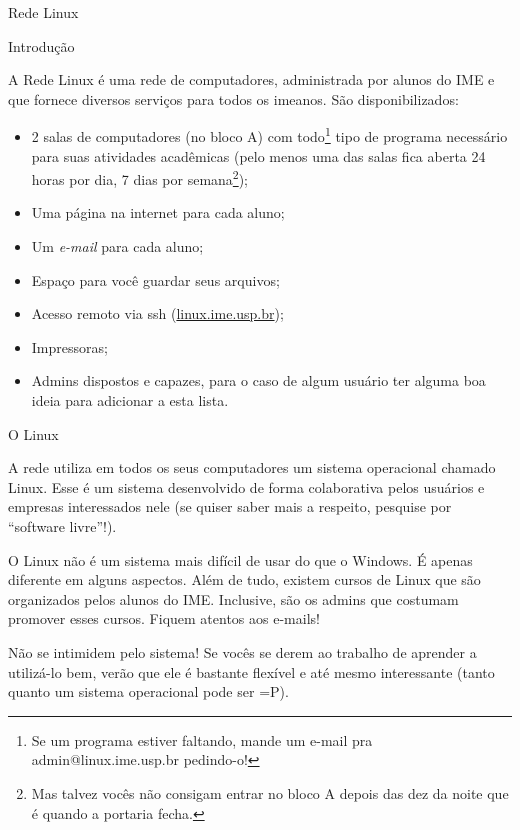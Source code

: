 \begin{subsecao}{Rede Linux}


\begin{subsubsecao}{Introdução}

A Rede Linux é uma rede de computadores, administrada por alunos do IME e
que fornece diversos serviços para todos os imeanos.
São disponibilizados:

\vspace{-1em}

\begin{itemize}
\item 2 salas de computadores (no bloco A) com todo\footnote{ Se um programa
estiver faltando, mande um e-mail pra admin@linux.ime.usp.br pedindo-o!} tipo de
programa necessário para suas atividades acadêmicas (pelo menos uma das salas fica
aberta 24 horas por dia, 7 dias por semana\footnote{ Mas talvez vocês não
consigam entrar no bloco A depois das dez da noite que é quando a portaria
fecha.});
\item Uma página na internet para cada aluno;
\item Um \textit{e-mail} para cada aluno;
\item Espaço para você guardar seus arquivos;
\item Acesso remoto via ssh (\url{linux.ime.usp.br});
\item Impressoras;
\item Admins dispostos e capazes, para o caso de algum usuário ter alguma boa
ideia para adicionar a esta lista.
\end{itemize}
\end{subsubsecao}

\begin{subsubsecao}{O Linux}

A rede utiliza em todos os seus computadores um sistema operacional chamado
Linux. Esse é um sistema desenvolvido de forma colaborativa pelos usuários
e empresas interessados nele (se quiser saber mais a respeito, pesquise
por ``software livre''!).

O Linux não é um sistema mais difícil de usar do que o Windows. É apenas
diferente em alguns aspectos. Além de tudo, existem cursos de Linux que são
organizados pelos alunos do IME. Inclusive, são os admins que costumam promover 
esses cursos. Fiquem atentos aos e-mails!

Não se intimidem pelo sistema! Se vocês se derem ao trabalho de
aprender a utilizá-lo bem, verão que ele é bastante flexível e até mesmo
interessante (tanto quanto um sistema operacional pode ser =P).


\end{subsubsecao}
\end{subsecao}
